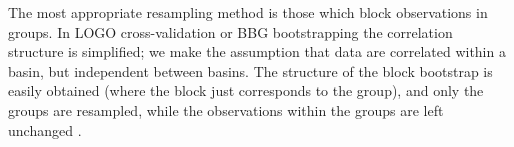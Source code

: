 The most appropriate resampling method is those which block observations in groups. In LOGO cross-validation or BBG bootstrapping the correlation structure is simplified; we make the assumption that data are correlated within a basin, but independent between basins. The structure of the block bootstrap is easily obtained (where the block just corresponds to the group), and only the groups are resampled, while the observations within the groups are left unchanged \cite{cameron2008bootstrap}.




